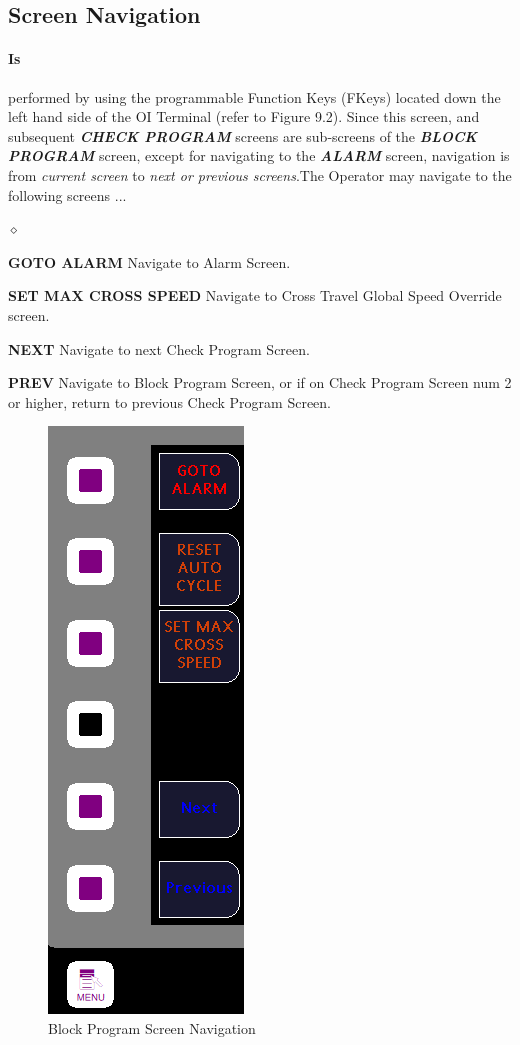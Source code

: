 \subsection{Screen Navigation}
\paragraph*{Is}performed by using the programmable Function Keys (FKeys) located down the left hand side of the OI Terminal (refer to Figure 9.2). Since this screen, and subsequent 	\textbf{\textit{CHECK PROGRAM}} screens are sub-screens of the \textbf{\textit{BLOCK PROGRAM}} screen, except for navigating to the \textbf{\textit{ALARM}} screen, navigation is from \textit{current screen} to \textit{next or previous screens}.The Operator may navigate to the following screens ...
\begin{list}{$\diamond$}{}
	\item \textbf{GOTO ALARM} Navigate to Alarm Screen.
	\item \textbf{SET MAX CROSS SPEED} Navigate to Cross Travel Global Speed Override screen.
	\item \textbf{NEXT} Navigate to next Check Program Screen.
	\item \textbf{PREV} Navigate to Block Program Screen, or if on Check Program Screen num 2 or higher, return to previous Check Program Screen.
\end{list}
\begin{figure}
	\centering
	\includegraphics[width=0.2\linewidth]{screen-captures/program/pgm-review1-nav}
	\caption{Block Program Screen Navigation}
	\label{fig:pgm-reveiw1-nav}
\end{figure}
